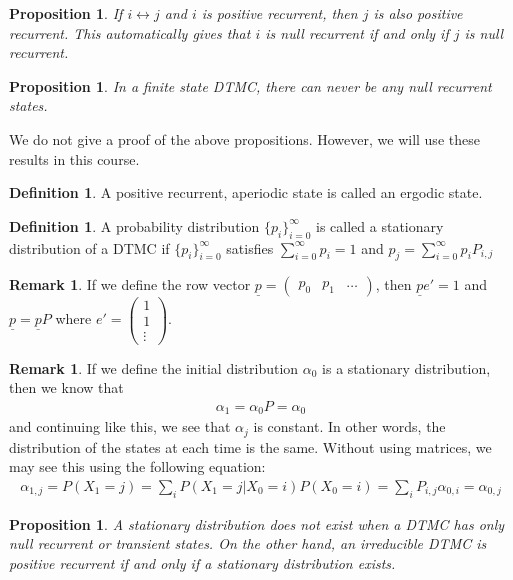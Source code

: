 \documentclass[11pt]{amsart}
\newtheorem{proposition}[theorem]{Proposition}
\theoremstyle{definition}
\newtheorem{definition}[theorem]{Definition}
\newtheorem{remark}[theorem]{Remark}
\numberwithin{equation}{section}
\begin{document}
 \begin{proposition}
     If $i\leftrightarrow j$ and $i$ is positive recurrent, then $j$ is also positive recurrent. This automatically gives that $i$ is null recurrent if and only if $j$ is null recurrent.
 \end{proposition}
 \begin{proposition}
     In a finite state DTMC, there can never be any null recurrent states.
 \end{proposition}
 We do not give a proof of the above propositions. However, we will use these results in this course.
 \begin{definition}
     A positive recurrent, aperiodic state is called an ergodic state.
 \end{definition}
 \begin{definition}
     A probability distribution $\{p_i\}_{i=0}^\infty$ is called a stationary distribution of a DTMC if $\{p_i\}_{i=0}^\infty$ satisfies $\sum_{i=0}^\infty p_i=1$ and $p_j=\sum_{i=0}^\infty p_iP_{i,j}$
 \end{definition}
 \begin{remark}
     If we define the row vector $\underline{p}=\begin{pmatrix}
         p_0 & p_1 & \ldots
     \end{pmatrix}$, then $\underline pe'=1$ and $\underline p=\underline pP$ where $e'=\begin{pmatrix}
         1\\1\\ \vdots
     \end{pmatrix}$.
 \end{remark}
 \begin{remark}
     If we define the initial distribution $\alpha_0$ is a stationary distribution, then we know that 
     \begin{align*}
         \alpha_1=\alpha_0P=\alpha_0
     \end{align*}
     and continuing like this, we see that $\alpha_j$ is constant. In other words, the distribution of the states at each time is the same. Without using matrices, we may see this using the following equation:
     \begin{align*}
         \alpha_{1,j}=P(X_1=j)=\sum_{i}P(X_1=j|X_0=i)P(X_0=i)=\sum_{i}P_{i,j}\alpha_{0,i}=\alpha_{0,j}
     \end{align*}
 \end{remark}
 \begin{proposition}
     A stationary distribution does not exist when a DTMC has only null recurrent or transient states. On the other hand, an irreducible DTMC is positive recurrent if and only if a stationary distribution exists.
 \end{proposition}
\end{document}
